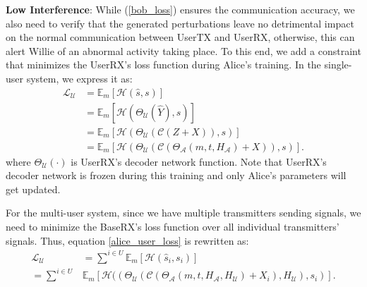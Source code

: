 
\textbf{Low Interference}: While (\ref{bob_loss}) ensures the communication accuracy, we also need to verify that the generated perturbations leave no detrimental impact on the normal communication between UserTX and UserRX, otherwise, this can alert Willie of an abnormal activity taking place. To this end, we add a constraint that minimizes the UserRX's loss function during Alice's training. In the single-user system, we express it as:
\begin{equation}
	\begin{aligned} \label{alice_user_loss}
	\mathcal{L}_{\mathcal{U}} & = \mathbb{E}_{m}[\mathcal{H}(\hat{s}, s)] \\
	& = \mathbb{E}_{m}[\mathcal{H}(\Theta_{\mathcal{U}}(\hat{Y}), s)] \\
	& = \mathbb{E}_{m}[\mathcal{H}(\Theta_{\mathcal{U}}(\mathcal{C}(Z + X)), s)] \\
	& = \mathbb{E}_{m}[\mathcal{H}(\Theta_{\mathcal{U}}(\mathcal{C}(\Theta_{\mathcal{A}}(m, t, H_{\mathcal{A}}) + X)), s)].
	\end{aligned}
\end{equation}
where \(\Theta_{\mathcal{U}}(\cdot)\) is UserRX's decoder network function. Note that UserRX's decoder network is frozen during this training and only Alice's parameters will get updated.

For the multi-user system, since we have multiple transmitters sending signals, we need to minimize the BaseRX's loss function over all individual transmitters' signals. Thus, equation \ref{alice_user_loss} is rewritten as:
\begin{equation}
	\begin{aligned} \label{multi_alice_user_loss}
		\mathcal{L}_{\mathcal{U}} & = \sum^{i \in U}\mathbb{E}_{m}[\mathcal{H}(\hat{s}_i, s_i)] \\
		= \sum^{i \in U} & 
			\mathbb{E}_{m}[\mathcal{H}
			((\Theta_{\mathcal{U}}(\mathcal{C}(\Theta_{\mathcal{A}}(m, t, H_{\mathcal{A}}, H_{\mathcal{U}}) + X_i),  H_{\mathcal{U}}), s_i)].
	\end{aligned}
\end{equation}

